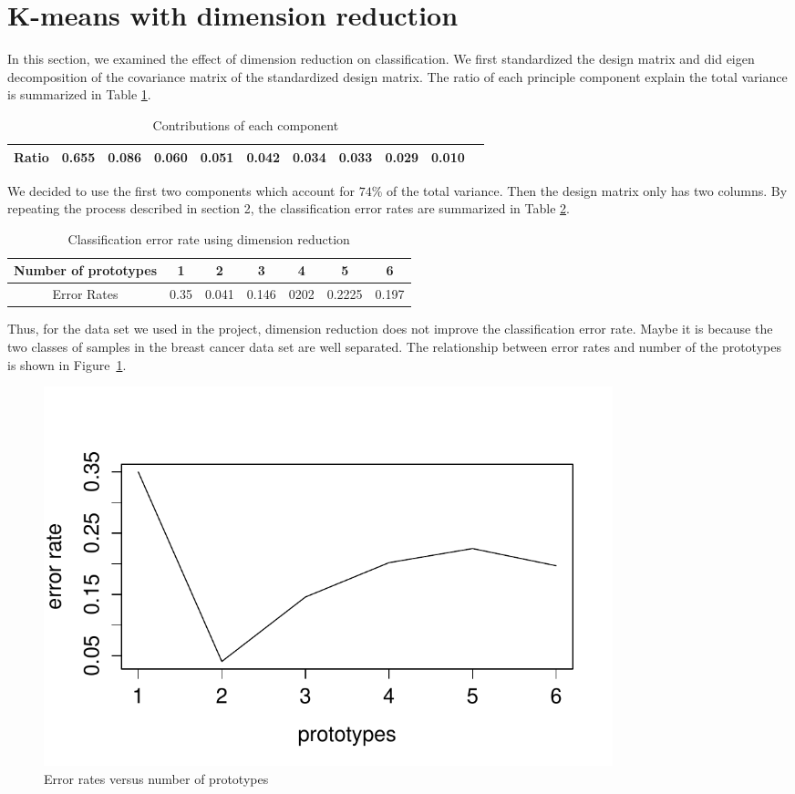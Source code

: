 \documentclass[12pt]{article}
\begin{document}
\section{K-means with dimension reduction}
In this section, we examined the effect of dimension reduction on classification. We first standardized the design matrix and did eigen decomposition of the covariance matrix of the standardized design matrix. The ratio of each principle component explain the total variance is summarized in Table \ref{tab3}.
\begin{table}[htbp]
	\begin{center}

		\caption{\label{tab3} Contributions of each component}
		\begin{tabular}{c|cccccccccc}
			\hline
			Ratio &0.655& 0.086& 0.060& 0.051& 0.042& 0.034& 0.033& 0.029& 0.010 \\
			\hline
		\end{tabular}
	\end{center}
\end{table}
We decided to use the first two components which account for $74$\% of the total variance. Then the design matrix only has two columns. By repeating the process described in section 2, the classification error rates are summarized in Table \ref{tab4}.
\begin{table}[htbp]
	\begin{center}
		\caption{\label{tab4} Classification error rate using dimension reduction}
		\begin{tabular}{c|cccccc}
			\hline
			Number of prototypes&1 &2 &3 &4&5&6 \\
			\hline
			Error Rates &0.35 &0.041 &0.146&0202&0.2225&0.197  \\
			\hline
		\end{tabular}
	\end{center}
\end{table}
Thus, for the data set we used in the project, dimension reduction does not improve the classification error rate. Maybe it is because the two classes of samples in the breast cancer data set are well separated. The relationship between error rates and number of the prototypes is shown in Figure~\ref{fig:kmeans1}.
\begin{figure}
	\centering
	\includegraphics[width=0.8\textwidth]{7.pdf}
	\caption{Error rates versus number of prototypes}
	\label{fig:kmeans1}
\end{figure}
\end{document}
